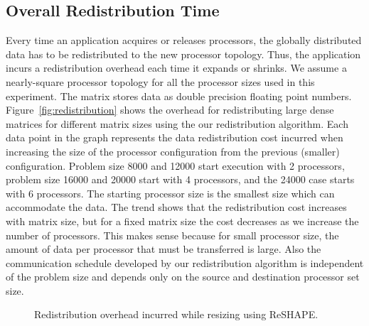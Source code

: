 \documentclass[letterpaper]{llncs}
\begin{document}
\subsection{Overall Redistribution Time}
Every time an application acquires or releases processors, the globally
distributed data has to be redistributed to the new processor topology.
Thus, the application incurs a redistribution overhead each time it expands or shrinks.
We assume a nearly-square processor topology for all the  processor sizes used in this experiment.
The matrix stores data as double precision floating point numbers.
Figure~\ref{fig:redistribution} shows the overhead for
redistributing large dense matrices
for different matrix sizes using the our redistribution algorithm.
Each data point in the graph represents the data redistribution cost
incurred when increasing the size of the processor configuration from the
previous (smaller) configuration. Problem size 8000 and 12000 start execution with 2 processors,
problem size  16000 and 20000 start with 4 processors, and the 24000
case starts with 6 processors. The starting processor size is the smallest size which can accommodate the data. 
The trend shows that the redistribution cost increases with matrix size,
but for a fixed matrix size
the cost decreases as we increase the number of processors. 
This makes sense because for small processor size, the amount of data per processor that must be transferred is large.
Also the communication schedule developed
by our redistribution algorithm is independent of the problem size and depends only on the  source and destination processor set size.
\begin{figure}[ht]
\caption{Redistribution overhead incurred while resizing using ReSHAPE.}
\end{figure}
\end{document}
